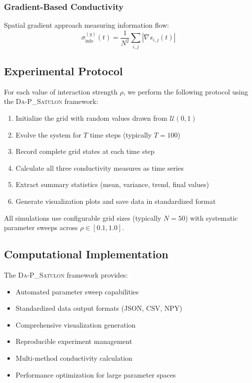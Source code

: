 \documentclass[twocolumn,showpacs,preprintnumbers,amsmath,amssymb,prb]{revtex4-2}
\newcommand{\satulon}{\textsc{Da-P\_Satulon}}
\newcommand{\infocond}{\sigma_{\text{info}}}
\newcommand{\rhointer}{\rho}
\begin{document}
\subsubsection{Gradient-Based Conductivity}
Spatial gradient approach measuring information flow:
\begin{equation}
\infocond^{(g)}(t) = \frac{1}{N^2} \sum_{i,j} |\nabla s_{i,j}(t)|
\label{eq:gradient_conductivity}
\end{equation}

\subsection{Experimental Protocol}
\label{sec:protocol}

For each value of interaction strength $\rhointer$, we perform the following protocol using the \satulon{} framework:

\begin{enumerate}
\item Initialize the grid with random values drawn from $\mathcal{U}(0,1)$
\item Evolve the system for $T$ time steps (typically $T = 100$)
\item Record complete grid states at each time step
\item Calculate all three conductivity measures as time series
\item Extract summary statistics (mean, variance, trend, final values)
\item Generate visualization plots and save data in standardized format
\end{enumerate}

All simulations use configurable grid sizes (typically $N = 50$) with systematic parameter sweeps across $\rhointer \in [0.1, 1.0]$.

\subsection{Computational Implementation}
\label{sec:implementation}

The \satulon{} framework provides:
\begin{itemize}
\item Automated parameter sweep capabilities
\item Standardized data output formats (JSON, CSV, NPY)
\item Comprehensive visualization generation
\item Reproducible experiment management
\item Multi-method conductivity calculation
\item Performance optimization for large parameter spaces
\end{itemize}
\end{document}
